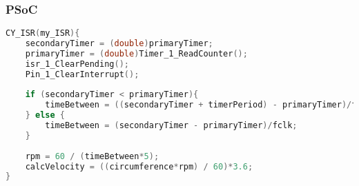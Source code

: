 \subsubsection{PSoC} \label{sec:psoc_sw_impl}

\begin{lstlisting}[caption={ISR for tachometer},label=lst:tachometerISR, language=c++]
CY_ISR(my_ISR){
    secondaryTimer = (double)primaryTimer;
    primaryTimer = (double)Timer_1_ReadCounter();
    isr_1_ClearPending();
    Pin_1_ClearInterrupt();
    
    if (secondaryTimer < primaryTimer){
        timeBetween = ((secondaryTimer + timerPeriod) - primaryTimer)/fclk;
    } else {
        timeBetween = (secondaryTimer - primaryTimer)/fclk;
    }
   
    rpm = 60 / (timeBetween*5);
    calcVelocity = ((circumference*rpm) / 60)*3.6;
}
\end{lstlisting} 